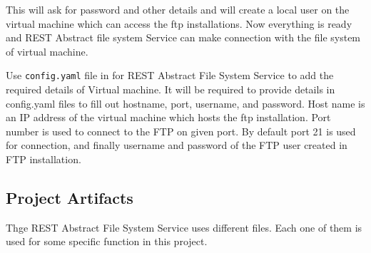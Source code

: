 This will ask for password and other details and will create a local
user on the virtual machine which can access the ftp installations.
Now everything is ready and REST Abstract file system Service can 
make connection with the file system of virtual machine.


Use \verb|config.yaml| file in for REST Abstract File System Service
to add the required details of Virtual machine.  It will be required
to provide details in config.yaml files to fill out hostname, port,
username, and password.
Host name is an IP address of the virtual machine which hosts the ftp 
installation. Port number is used to connect to the FTP on given port. By 
default port 21 is used for connection, and finally username and password of 
the FTP user created in FTP installation.


\subsection{Project Artifacts}

Thge REST Abstract File System Service uses different files. 
Each one of them is used for some specific function in this project.

